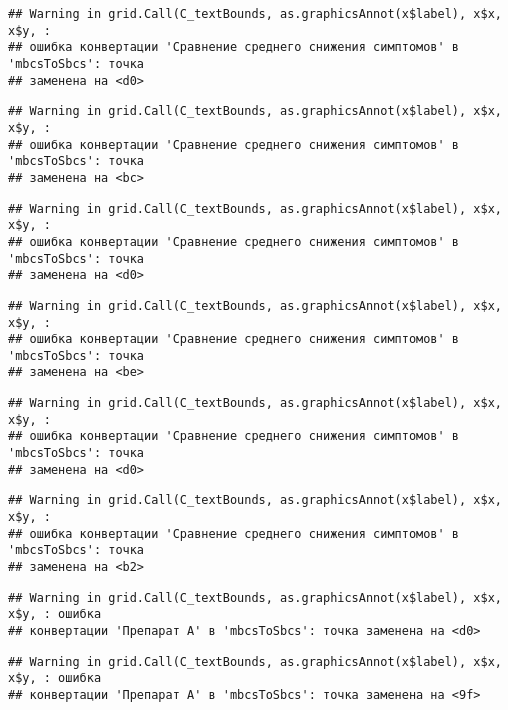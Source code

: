 \documentclass[
]{article}
\begin{document}
\begin{verbatim}
## Warning in grid.Call(C_textBounds, as.graphicsAnnot(x$label), x$x, x$y, :
## ошибка конвертации 'Сравнение среднего снижения симптомов' в 'mbcsToSbcs': точка
## заменена на <d0>
\end{verbatim}

\begin{verbatim}
## Warning in grid.Call(C_textBounds, as.graphicsAnnot(x$label), x$x, x$y, :
## ошибка конвертации 'Сравнение среднего снижения симптомов' в 'mbcsToSbcs': точка
## заменена на <bc>
\end{verbatim}

\begin{verbatim}
## Warning in grid.Call(C_textBounds, as.graphicsAnnot(x$label), x$x, x$y, :
## ошибка конвертации 'Сравнение среднего снижения симптомов' в 'mbcsToSbcs': точка
## заменена на <d0>
\end{verbatim}

\begin{verbatim}
## Warning in grid.Call(C_textBounds, as.graphicsAnnot(x$label), x$x, x$y, :
## ошибка конвертации 'Сравнение среднего снижения симптомов' в 'mbcsToSbcs': точка
## заменена на <be>
\end{verbatim}

\begin{verbatim}
## Warning in grid.Call(C_textBounds, as.graphicsAnnot(x$label), x$x, x$y, :
## ошибка конвертации 'Сравнение среднего снижения симптомов' в 'mbcsToSbcs': точка
## заменена на <d0>
\end{verbatim}

\begin{verbatim}
## Warning in grid.Call(C_textBounds, as.graphicsAnnot(x$label), x$x, x$y, :
## ошибка конвертации 'Сравнение среднего снижения симптомов' в 'mbcsToSbcs': точка
## заменена на <b2>
\end{verbatim}

\begin{verbatim}
## Warning in grid.Call(C_textBounds, as.graphicsAnnot(x$label), x$x, x$y, : ошибка
## конвертации 'Препарат A' в 'mbcsToSbcs': точка заменена на <d0>
\end{verbatim}

\begin{verbatim}
## Warning in grid.Call(C_textBounds, as.graphicsAnnot(x$label), x$x, x$y, : ошибка
## конвертации 'Препарат A' в 'mbcsToSbcs': точка заменена на <9f>
\end{verbatim}
\end{document}
